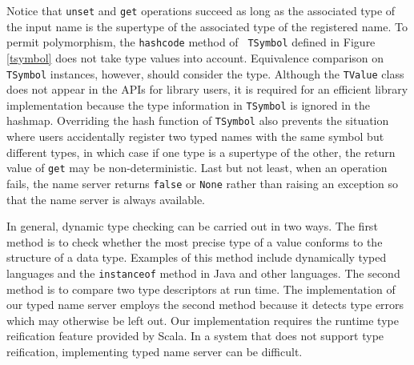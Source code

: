 Notice that {\tt unset} and {\tt get} operations succeed as long as the 
associated type of the input name is the supertype of the associated type of 
the registered name.  To permit polymorphism, the {\tt hashcode} method of {\tt 
TSymbol} defined in  Figure {\ref{tsymbol}} does not take type values into 
account.  Equivalence comparison on {\tt TSymbol} instances, however, should 
consider the type.  Although the {\tt TValue} class does not appear in the
APIs for library users, it is required for an efficient library implementation 
because the type 
information in {\tt TSymbol} is ignored in the hashmap.  Overriding the
hash function of {\tt TSymbol} also prevents the situation where users accidentally
register two typed names with the same symbol but different types,
in which case if one type is a supertype of the other, the return value of
{\tt get} may be non-deterministic.  Last but not least, when an operation 
fails, the name server returns {\tt false} or {\tt None} rather than raising an
exception so that the name server is always available.

In general, dynamic type checking can be carried out in two ways.  The first 
method is to check whether the most precise type of a value conforms to the
structure of a data type.  Examples of this method include dynamically typed
languages and the {\tt instanceof} method in Java and other languages.  The
second method is to compare two type descriptors at run time.  The
implementation of our typed name server employs the second method because  
it detects type errors which may otherwise be left out.  Our
implementation requires the runtime type reification feature provided by Scala.
In a system that does not support type reification, implementing typed name 
server can be difficult.


